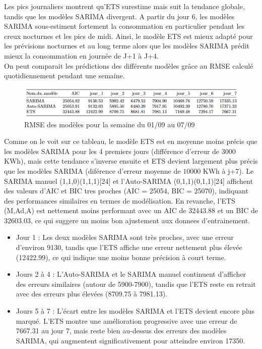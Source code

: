 \documentclass{article}
\theoremstyle{definition}
\theoremstyle{remark}
\begin{document}
Les pics journaliers montrent qu’ETS surestime mais suit la tendance globale, tandis que les modèles SARIMA
divergent. A partir du jour 6, les modèles SARIMA sous-estiment fortement la consommation en particulier pendant les creux nocturnes et les pics de midi. \newline
Ainsi, le modèle ETS est mieux adapté pour les prévisions nocturnes et au long terme alors que les modèles SARIMA prédit mieux la consommation en journée de J+1 à J+4.\newline \\
On peut comparait les prédictions des différents modèles grâce au RMSE calculé quotidiennement pendant une semaine. 
\FloatBarrier
\begin{figure}[!h]
    \centering
    \includegraphics[width=1\linewidth]{fig21.png}
    \caption{RMSE des modèles pour la semaine du 01/09 au 07/09}
    \label{fig:enter-label}
\end{figure}
Comme on le voit sur ce tableau, le modèle ETS est en moyenne moins précis que les modèles SARIMA pour les 4 premiers jours (différence d'erreur de $3000$ KWh), mais cette tendance s'inverse ensuite et ETS devient largement plus précis que les modèles SARIMA (diférence d'erreur moyenne de $10000$ KWh à j+7).
Le SARIMA manuel (1,1,0)(1,1,1)[24] et l'Auto-SARIMA (0,1,1)(0,1,1)[24] affichent des valeurs d'AIC et BIC tres proches (AIC = 25054, BIC = 25070), indiquant des performances similaires en termes de modélisation. En revanche, l'ETS (M,Ad,A) est nettement moins performant avec un AIC de 32443.88 et un BIC de 32603.03, ce qui suggere un moins bon ajustement aux donnees d'entrainement.
\begin{itemize}
    \item Jour 1 : Les deux modèles SARIMA sont très proches, avec une erreur d’environ 9130, tandis que l’ETS affiche une erreur nettement plus élevée (12422.99), ce qui indique une moins bonne précision à court terme.
    \item Jours 2 à 4 : L’Auto-SARIMA et le SARIMA manuel continuent d'afficher des erreurs similaires (autour de 5900-7900), tandis que l’ETS reste en retrait avec des erreurs plus élevées (8709.75 à 7981.13).
    \item Jours 5 à 7 : L’écart entre les modèles SARIMA et l’ETS devient encore plus marqué. L’ETS montre une amélioration progressive avec une erreur de 7667.31 au jour 7, mais reste bien au-dessus des erreurs des modèles SARIMA, qui augmentent significativement pour atteindre environ 17350.
\end{itemize}
\end{document}
